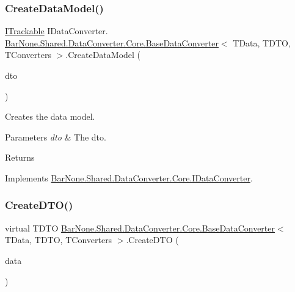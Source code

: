 \subsubsection{\texorpdfstring{Create\+Data\+Model()}{CreateDataModel()}\hspace{0.1cm}{\footnotesize\ttfamily [2/2]}}
{\footnotesize\ttfamily \mbox{\hyperlink{interface_bar_none_1_1_shared_1_1_core_1_1_i_trackable}{I\+Trackable}} I\+Data\+Converter. \mbox{\hyperlink{class_bar_none_1_1_shared_1_1_data_converter_1_1_core_1_1_base_data_converter}{Bar\+None.\+Shared.\+Data\+Converter.\+Core.\+Base\+Data\+Converter}}$<$ T\+Data, T\+D\+TO, T\+Converters $>$.Create\+Data\+Model (\begin{DoxyParamCaption}\item[{\mbox{\hyperlink{interface_bar_none_1_1_shared_1_1_core_1_1_i_trackable_d_t_o}{I\+Trackable\+D\+TO}}}]{dto }\end{DoxyParamCaption})\hspace{0.3cm}{\ttfamily [private]}}



Creates the data model. 


\begin{DoxyParams}{Parameters}
{\em dto} & The dto.\\
\hline
\end{DoxyParams}
\begin{DoxyReturn}{Returns}

\end{DoxyReturn}


Implements \mbox{\hyperlink{interface_bar_none_1_1_shared_1_1_data_converter_1_1_core_1_1_i_data_converter}{Bar\+None.\+Shared.\+Data\+Converter.\+Core.\+I\+Data\+Converter}}.

\mbox{\label{class_bar_none_1_1_shared_1_1_data_converter_1_1_core_1_1_base_data_converter_afdcc049c759d824f4954a6be3e862482}} 
\subsubsection{\texorpdfstring{Create\+D\+T\+O()}{CreateDTO()}\hspace{0.1cm}{\footnotesize\ttfamily [1/2]}}
{\footnotesize\ttfamily virtual T\+D\+TO \mbox{\hyperlink{class_bar_none_1_1_shared_1_1_data_converter_1_1_core_1_1_base_data_converter}{Bar\+None.\+Shared.\+Data\+Converter.\+Core.\+Base\+Data\+Converter}}$<$ T\+Data, T\+D\+TO, T\+Converters $>$.Create\+D\+TO (\begin{DoxyParamCaption}\item[{T\+Data}]{data }\end{DoxyParamCaption})\hspace{0.3cm}{\ttfamily [virtual]}}



